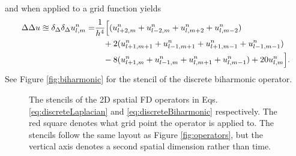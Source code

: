 and when applied to a grid function yields
\begin{equation}\nonumber
    \begin{aligned}
    \Delta\Delta u\approxeq\delta_{\Delta}\delta_{\Delta} u_{l,m}^n =&\frac{1}{h^4}\Big[(u_{l+2, m}^n + u_{l-2, m}^n+u_{l, m+2}^n+u_{l, m-2}^n)\\
    &\ \ \ +2(u_{l+1, m+1}^n + u_{l-1, m+1}^n+u_{l+1, m-1}^n+u_{l-1, m-1}^n)\\
    &\ \ \ -8(u_{l+1, m}^n + u_{l-1, m}^n+u_{l, m+1}^n+u_{l, m-1}^n) + 20u_{l,m}^n\Big].
    \end{aligned}
\end{equation}
See Figure \ref{fig:biharmonic} for the stencil of the discrete biharmonic operator.
\begin{figure}[h]
    \centering
    \hspace{0.06\textwidth}
    \caption{The stencils of the 2D spatial FD operators in Eqs. \eqref{eq:discreteLaplacian} and \eqref{eq:discreteBiharmonic} respectively. The red square denotes what grid point the operator is applied to. The stencils follow the same layout as Figure \ref{fig:operators}, but the vertical axis denotes a second spatial dimension rather than time. \label{fig:2Doperators}}
\end{figure}

